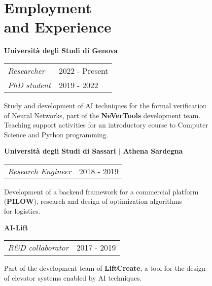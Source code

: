 \section{\sc Employment \\and Experience}

{\bf{Universit\`a degli Studi di Genova}}\\
\begin{tabular}{@{}p{4in}p{2in}}
	\textit{Researcher} & 2022 - Present\\
	\textit{PhD student} & 2019 - 2022\\
\end{tabular}

\begin{list1}
	\item[] Study and development of AI techniques for the formal verification\\
	of Neural Networks, part of the \textbf{NeVerTools} development team.\\
	Teaching support activities for an introductory course to Computer\\
	Science and Python programming.
\end{list1}


{\bf{Universit\`a degli Studi di Sassari $\vert$ Athena Sardegna}}\\
\begin{tabular}{@{}p{4in}p{2in}}
	\textit{Research Engineer} & 2018 - 2019\\
\end{tabular}

\begin{list1}
	\item[] Development of a backend framework for a commercial platform\\
	(\textbf{PILOW}), research and design of optimization algorithms\\
	for logistics.
\end{list1}


{\bf{AI-Lift}}\\
\begin{tabular}{@{}p{4in}p{2in}}
	\textit{R\&D collaborator}  & 2017 - 2019\\
\end{tabular}

\begin{list1}
	\item[] Part of the development team of \textbf{LiftCreate}, a tool for the design\\
	of elevator systems enabled by AI techniques.
\end{list1}
